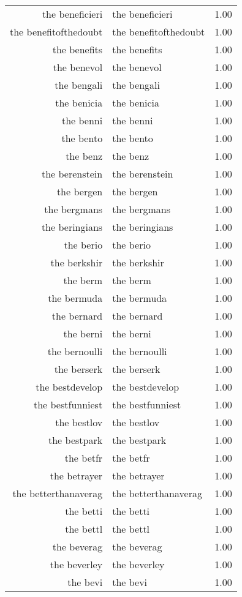 \begin{table}[ht]
\begin{tabular}{rlr}
  the beneficieri & the beneficieri & 1.00 \\ 
  the benefitofthedoubt & the benefitofthedoubt & 1.00 \\ 
  the benefits & the benefits & 1.00 \\ 
  the benevol & the benevol & 1.00 \\ 
  the bengali & the bengali & 1.00 \\ 
  the benicia & the benicia & 1.00 \\ 
  the benni & the benni & 1.00 \\ 
  the bento & the bento & 1.00 \\ 
  the benz & the benz & 1.00 \\ 
  the berenstein & the berenstein & 1.00 \\ 
  the bergen & the bergen & 1.00 \\ 
  the bergmans & the bergmans & 1.00 \\ 
  the beringians & the beringians & 1.00 \\ 
  the berio & the berio & 1.00 \\ 
  the berkshir & the berkshir & 1.00 \\ 
  the berm & the berm & 1.00 \\ 
  the bermuda & the bermuda & 1.00 \\ 
  the bernard & the bernard & 1.00 \\ 
  the berni & the berni & 1.00 \\ 
  the bernoulli & the bernoulli & 1.00 \\ 
  the berserk & the berserk & 1.00 \\ 
  the bestdevelop & the bestdevelop & 1.00 \\ 
  the bestfunniest & the bestfunniest & 1.00 \\ 
  the bestlov & the bestlov & 1.00 \\ 
  the bestpark & the bestpark & 1.00 \\ 
  the betfr & the betfr & 1.00 \\ 
  the betrayer & the betrayer & 1.00 \\ 
  the betterthanaverag & the betterthanaverag & 1.00 \\ 
  the betti & the betti & 1.00 \\ 
  the bettl & the bettl & 1.00 \\ 
  the beverag & the beverag & 1.00 \\ 
  the beverley & the beverley & 1.00 \\ 
  the bevi & the bevi & 1.00 \\ 

\end{tabular}
\end{table}
